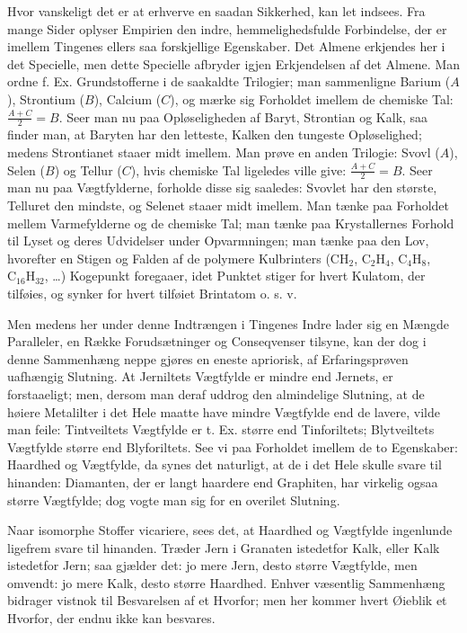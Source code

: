 \documentclass[12pt]{book}
\newcommand{\opage}[1]{\marginnote{\footnotesize\textit{[#1]}}}
\begin{document}
Hvor vanskeligt det er at erhverve en saadan Sikkerhed, kan let indsees. Fra mange Sider
oplyser Empirien den indre, hemmelighedsfulde Forbindelse, der er imellem Tingenes ellers
saa forskjellige Egenskaber. Det Almene erkjendes her i det Specielle, men dette Specielle
afbryder igjen Erkjendelsen af det Almene. Man ordne f. Ex. Grundstofferne i de saakaldte
Trilogier; man sammenligne Barium ($A$), Strontium ($B$), Calcium ($C$), og mærke sig
Forholdet imellem de chemiske Tal: $\frac{A+C}{2}=B$. Seer man nu paa Opløseligheden af
\opage{106} Baryt, Strontian og Kalk, saa finder man, at Baryten har den letteste, Kalken den tungeste
Opløselighed; medens Strontianet staaer midt imellem. Man prøve en anden Trilogie: Svovl
($A$), Selen ($B$) og Tellur ($C$), hvis chemiske Tal ligeledes ville give:
$\frac{A+C}{2}=B$. Seer man nu paa Vægtfylderne, forholde disse sig saaledes: Svovlet har
den største, Telluret den mindste, og Selenet staaer midt imellem. Man tænke paa Forholdet
mellem Varmefylderne og de chemiske Tal; man tænke paa Krystallernes Forhold til Lyset og
deres Udvidelser under Opvarmningen; man tænke paa den Lov, hvorefter en Stigen og Falden af
de polymere Kulbrinters ($\mathrm{CH_2}$, $\mathrm{C_2H_4}$, $\mathrm{C_4H_8}$,
$\mathrm{C_{16}H_{32}}$, \ldots) Kogepunkt foregaaer, idet Punktet stiger for hvert Kulatom,
der tilføies, og synker for hvert tilføiet Brintatom o. s. v.

Men medens her under denne Indtrængen i Tingenes Indre lader sig en Mængde Paralleler, en
Række Forudsætninger og Conseqvenser tilsyne, kan der dog i denne Sammenhæng neppe gjøres en
eneste apriorisk, af Erfaringsprøven uafhængig Slutning. At Jerniltets Vægtfylde er mindre
end Jernets, er forstaaeligt; men, dersom man deraf uddrog den almindelige Slutning, at de
høiere Metalilter i det Hele maatte have mindre Vægtfylde end de lavere, vilde man feile:
Tintveiltets Vægtfylde er t. Ex. større end Tinforiltets; Blytveiltets Vægtfylde større end
Blyforiltets. See vi paa Forholdet imellem de to Egenskaber: Haardhed og Vægtfylde, da synes
det naturligt, at de i det Hele skulle svare til hinanden: Diamanten, der er langt haardere
end Graphiten, har virkelig ogsaa større Vægtfylde; dog vogte man sig for en overilet
Slutning.

Naar isomorphe Stoffer vicariere, sees det, at Haardhed og Vægtfylde ingenlunde ligefrem
svare til hinanden. Træder Jern i Granaten istedetfor Kalk, eller Kalk istedetfor Jern; saa
gjælder det: jo mere Jern, desto større Vægtfylde, men omvendt: jo mere Kalk, desto større
Haardhed. Enhver
\opage{107} væsentlig Sammenhæng bidrager vistnok til Besvarelsen af et Hvorfor; men her kommer hvert
Øieblik et Hvorfor, der endnu ikke kan besvares.
\end{document}
